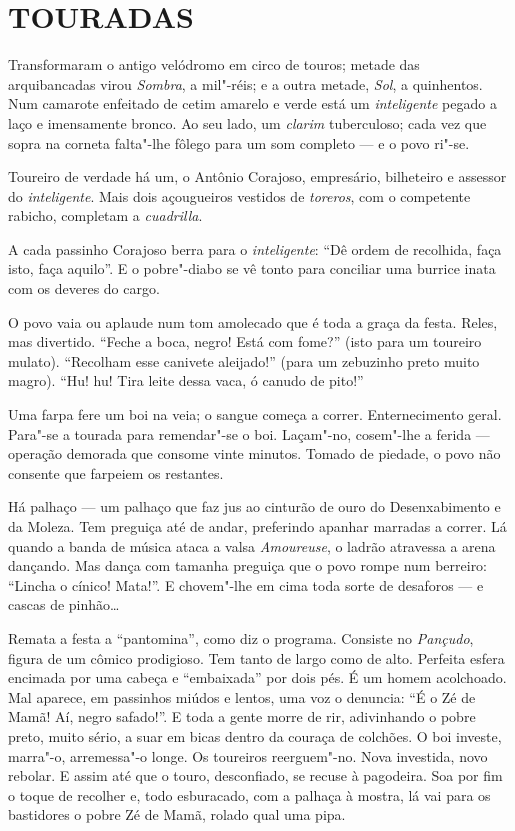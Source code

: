 \section*{TOURADAS}

Transformaram o antigo velódromo em circo de touros; metade das
arquibancadas virou \emph{Sombra}, a mil"-réis; e a outra metade,
\emph{Sol}, a quinhentos. Num camarote enfeitado de cetim amarelo e
verde está um \emph{inteligente} pegado a laço e imensamente bronco. Ao
seu lado, um \emph{clarim} tuberculoso; cada vez que sopra na corneta
falta"-lhe fôlego para um som completo --- e o povo ri"-se.

Toureiro de verdade há um, o Antônio Corajoso, empresário, bilheteiro e
assessor do \emph{inteligente}. Mais dois açougueiros vestidos de
\emph{toreros}, com o competente rabicho, completam a \emph{cuadrilla}.

A cada passinho Corajoso berra para o \emph{inteligente}: ``Dê ordem de
recolhida, faça isto, faça aquilo''. E o pobre"-diabo se vê tonto para
conciliar uma burrice inata com os deveres do cargo.

O povo vaia ou aplaude num tom amolecado que é toda a graça da festa.
Reles, mas divertido. ``Feche a boca, negro! Está com fome?'' (isto para
um toureiro mulato). ``Recolham esse canivete aleijado!'' (para um
zebuzinho preto muito magro). ``Hu! hu! Tira leite dessa vaca, ó canudo
de pito!''

Uma farpa fere um boi na veia; o sangue começa a correr. Enternecimento
geral. Para"-se a tourada para remendar"-se o boi. Laçam"-no, cosem"-lhe a
ferida --- operação demorada que consome vinte minutos. Tomado de
piedade, o povo não consente que farpeiem os restantes.

Há palhaço --- um palhaço que faz jus ao cinturão de ouro do
Desenxabimento e da Moleza. Tem preguiça até de andar, preferindo
apanhar marradas a correr. Lá quando a banda de música ataca a valsa
\emph{Amoureuse}, o ladrão atravessa a arena dançando. Mas dança com
tamanha preguiça que o povo rompe num berreiro: ``Lincha o cínico!
Mata!''. E chovem"-lhe em cima toda sorte de desaforos --- e cascas de
pinhão\ldots{}

Remata a festa a ``pantomina'', como diz o programa. Consiste no
\emph{Pançudo}, figura de um cômico prodigioso. Tem tanto de largo como
de alto. Perfeita esfera encimada por uma cabeça e ``embaixada'' por
dois pés. É um homem acolchoado. Mal aparece, em passinhos miúdos e
lentos, uma voz o denuncia: ``É o Zé de Mamã! Aí, negro safado!''. E
toda a gente morre de rir, adivinhando o pobre preto, muito sério, a
suar em bicas dentro da couraça de colchões. O boi investe, marra"-o,
arremessa"-o longe. Os toureiros reerguem"-no. Nova investida, novo
rebolar. E assim até que o touro, desconfiado, se recuse à pagodeira.
Soa por fim o toque de recolher e, todo esburacado, com a palhaça à
mostra, lá vai para os bastidores o pobre Zé de Mamã, rolado qual uma
pipa.

